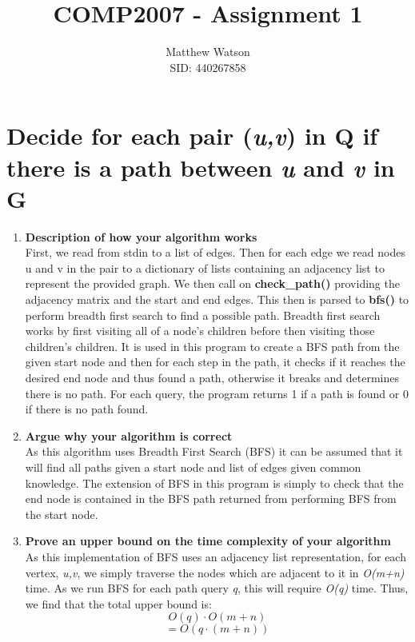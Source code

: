 \documentclass[11pt, oneside]{article}   	%
\title{COMP2007 - Assignment 1}
\author{Matthew Watson\\ SID: 440267858}
\date{}							%
\begin{document}
\maketitle

\section{Decide for each pair (\textit{u,v}) in Q if there is a path between \textit{u} and \textit{v} in G}
\begin{enumerate}[label=(\alph*)]
\item{\textbf{Description of how your algorithm works}}\\
First, we read from stdin to a list of edges. Then for each edge we read nodes u and v in the pair to a dictionary of lists containing an adjacency list to represent the provided graph.
We then call on \textbf{check\_path\big(\big)} providing the adjacency matrix and the start and end edges. This then is parsed to \textbf{bfs\big(\big)} to perform breadth first search to find a possible path. 
Breadth first search works by first visiting all of a node's children before then visiting those children's children. It is used in this program to create a BFS path from the given start node and then for each step in the path, it checks if it reaches the desired end node and thus found a path, otherwise it breaks and determines there is no path.
For each query, the program returns 1 if a path is found or 0 if there is no path found.
\item{\textbf{Argue why your algorithm is correct}}\\
As this algorithm uses Breadth First Search (BFS) it can be assumed that it will find all paths given a start node and list of edges given common knowledge. The extension of BFS in this program is simply to check that the end node is contained in the BFS path returned from performing BFS from the start node. 
\item{\textbf{Prove an upper bound on the time complexity of your algorithm}}\\
As this implementation of BFS uses an adjacency list representation, for each vertex, \textit{u,v}, we simply traverse the nodes which are adjacent to it in \textit{O(m+n)} time. As we run BFS for each path query \textit{q}, this will require \textit{O(q)} time. Thus, we find that the total upper bound is:
\[ O(q) \cdot O(m+n)  \]
\[ = O(q\cdot(m+n))  \]
\end{enumerate}
\end{document}
